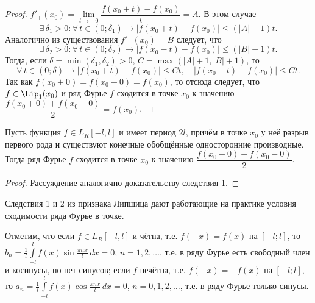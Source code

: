 \begin{proof}
$f'_+(x_0) = \lim\limits_{t \to +0} \dfrac{f(x_0 + t) - f(x_0)}{t} = A$. В этом случае
$$
\exists\, \delta_1 > 0 : \forall\, t \in (0; \delta_1) \longrightarrow |f(x_0 + t) - f(x_0)| \le (|A| + 1) t.
$$
Аналогично из существования $f'_-(x_0) = B$ следует, что
$$
\exists\, \delta_2 > 0 : \forall\, t \in (0; \delta_2) \longrightarrow |f(x_0 - t) - f(x_0)| \le (|B| + 1) t.
$$
Тогда, если $\delta = \min(\delta_1, \delta_2) > 0$, $C = \max(|A| + 1, |B| + 1)$, то
$$
\forall\, t \in (0; \delta) \longrightarrow |f(x_0 + t) - f(x_0)| \le C t, \quad |f(x_0 - t) - f(x_0)| \le C t.
$$
Так как $f(x_0 + 0) = f(x_0 - 0) = f(x_0)$, то отсюда следует, что $f \in \Lip_1(x_0)$ и ряд Фурье $f$ сходится в точке $x_0$ к значению $\dfrac{f(x_0 + 0) + f(x_0 - 0)}{2} = f(x_0)$.
\end{proof}

\begin{cons}
Пусть функция $f \in L_R[-l, l]$ и имеет период $2l$, причём в точке $x_0$ у неё разрыв первого рода и существуют конечные обобщённые односторонние производные. Тогда ряд Фурье $f$ сходится в точке $x_0$ к значению $\dfrac{f(x_0 + 0) + f(x_0 - 0)}{2}$.
\end{cons}

\begin{proof}
Рассуждение аналогично доказательству следствия 1.
\end{proof}

Следствия 1 и 2 из признака Липшица дают работающие на практике условия сходимости ряда Фурье в точке.

Отметим, что если $f \in L_R[-l, l]$ и чётна, т.е. $f(-x) = f(x)$ на $[-l; l]$, то $b_n = \frac{1}{l} \int\limits_{-l}^l f(x) \sin \frac{\pi n x}{l}\,dx = 0$, $n = 1, 2, \ldots$, т.е. в ряду Фурье есть свободный член и косинусы, но нет синусов; если $f$ нечётна, т.е. $f(-x) = -f(x)$ на $[-l; l]$, то $a_n = \frac{1}{l} \int\limits_{-l}^l f(x) \cos \frac{\pi n x}{l}\,dx = 0$, $n = 0, 1, 2, \ldots$, т.е. в ряду Фурье только синусы.


